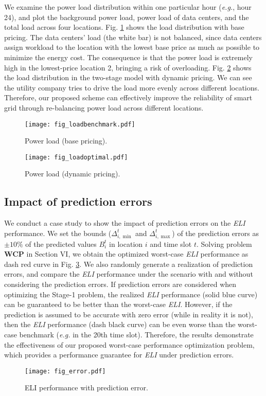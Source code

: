 \documentclass[journal]{IEEEtran}
\begin{document}
	
	We examine the power load distribution within one particular hour (\emph{e.g.}, hour 24), and plot the background power load, power load of data centers, and the total load across four locations. Fig. \ref{fig_loadbenchmark} shows the load distribution with base pricing. The data centers' load (the white bar) is not balanced, since data centers assign workload to the location with the lowest base price as much as possible to minimize the energy cost. The consequence is that the power load is extremely high in the lowest-price location 2, bringing a risk of overloading. Fig. \ref{fig_loadoptimal} shows the load distribution in the two-stage model with dynamic pricing. We can see the utility company tries to drive the load more evenly across different locations. Therefore, our proposed scheme can effectively improve the reliability of smart grid through re-balancing power load across different locations. 
	\begin{figure}[tbhp]
		\vspace{-2mm}
		\centering
		\texttt{[image: fig\_loadbenchmark.pdf]}
		\caption{\label{fig_loadbenchmark}Power load (base pricing).}
\end{figure}
	\begin{figure}[tbhp]
		\vspace{-2mm}
		\centering
		\texttt{[image: fig\_loadoptimal.pdf]}
		\caption{\label{fig_loadoptimal}Power load (dynamic pricing).}
		\vspace{-4mm}
	\end{figure}
		
	
	\subsection{Impact of prediction errors}
	We conduct a case study to show the impact of prediction errors on the \emph{ELI} performance. We set the bounds ($\Delta_{i,\min}^{t}$ and $\Delta_{i,\max}^{t}$) of the prediction errors as $\pm 10 \%$ of the predicted values $B_i^t$ in location $i$ and time slot $t$. Solving problem \textbf{WCP} in Section VI, we obtain the optimized worst-case \emph{ELI} performance as dash red curve in Fig. \ref{fig_error}. We also randomly generate a realization of prediction errors, and compare the \emph{ELI} performance under the scenario with and without considering the prediction errors. If prediction errors are considered when optimizing the Stage-1 problem, the realized \emph{ELI} performance (solid blue curve) can be guaranteed to be better than the worst-case \emph{ELI}. However, if the prediction is assumed to be accurate with zero error (while in reality it is not), then the \emph{ELI} performance (dash black curve) can be even worse than the worst-case benchmark (\emph{e.g.} in the 20th time slot). Therefore, the results demonstrate the effectiveness of our proposed worst-case performance optimization problem, which provides a performance guarantee for \emph{ELI} under prediction errors.
	\begin{figure}[tbhp]
\centering
		\texttt{[image: fig\_error.pdf]}
		\caption{\label{fig_error}ELI performance with prediction error.}
		\vspace{-4mm}
	\end{figure}
	
\end{document}
